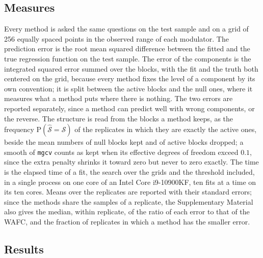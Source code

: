 \documentclass[12pt]{article} %
\theoremstyle{definition}
\theoremstyle{plain}
\newcommand{\Prob}{\mathrm{P}}
\begin{document}
{\subsection{Measures}
\label{sec:sim-measures}

Every method is asked the same questions on the test sample and on a grid of
256 equally spaced points in the observed range of each modulator. The
prediction error is the root mean squared difference between the fitted and
the true regression function on the test sample. The error of the components
is the integrated squared error summed over the blocks, with the fit and the
truth both centered on the grid, because every method fixes the level of a
component by its own convention; it is split between the active blocks and
the null ones, where it measures what a method puts where there is nothing.
The two errors are reported separately, since a method can predict well with
wrong components, or the reverse. The structure is read from the blocks a
method keeps, as the frequency $\Prob(\widehat{\mathcal{S}} = \mathcal{S})$ of
the replicates in which they are exactly the active ones, beside the mean
numbers of null blocks kept and of active blocks dropped; a smooth of
\texttt{mgcv} counts as kept when its effective degrees of freedom exceed
$0.1$, since the extra penalty shrinks it toward zero but never to zero
exactly. The time is the elapsed time of a fit, the search over the grids and
the threshold included, in a single process on one core of an Intel Core
i9-10900KF, ten fits at a time on its ten cores. Means over
the replicates are reported with their standard errors; since the methods
share the samples of a replicate, the Supplementary Material also gives the
median, within replicate, of the ratio of each error to that of the WAFC, and
the fraction of replicates in which a method has the smaller error.

\subsection{Results}
\label{sec:sim-results}

}
\end{document}

